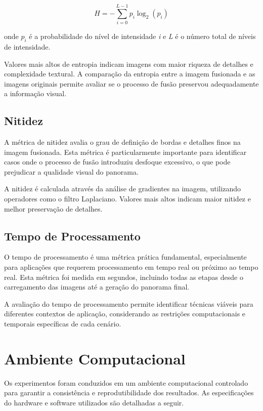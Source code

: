 \begin{equation}
H = -\sum_{i=0}^{L-1} p_i \log_2(p_i)
\end{equation}

\noindent onde $p_i$ é a probabilidade do nível de intensidade \textit{i} e \textit{L} é o número total de níveis de intensidade.

Valores mais altos de entropia indicam imagens com maior riqueza de detalhes e complexidade textural. A comparação da entropia entre a imagem fusionada e as imagens originais permite avaliar se o processo de fusão preservou adequadamente a informação visual.

\subsection{Nitidez}

A métrica de nitidez avalia o grau de definição de bordas e detalhes finos na imagem fusionada. Esta métrica é particularmente importante para identificar casos onde o processo de fusão introduziu desfoque excessivo, o que pode prejudicar a qualidade visual do panorama.

A nitidez é calculada através da análise de gradientes na imagem, utilizando operadores como o filtro Laplaciano. Valores mais altos indicam maior nitidez e melhor preservação de detalhes.

\subsection{Tempo de Processamento}

O tempo de processamento é uma métrica prática fundamental, especialmente para aplicações que requerem processamento em tempo real ou próximo ao tempo real. Esta métrica foi medida em segundos, incluindo todas as etapas desde o carregamento das imagens até a geração do panorama final.

A avaliação do tempo de processamento permite identificar técnicas viáveis para diferentes contextos de aplicação, considerando as restrições computacionais e temporais específicas de cada cenário.

\section{Ambiente Computacional}

Os experimentos foram conduzidos em um ambiente computacional controlado para garantir a consistência e reprodutibilidade dos resultados. As especificações do hardware e software utilizados são detalhadas a seguir.

